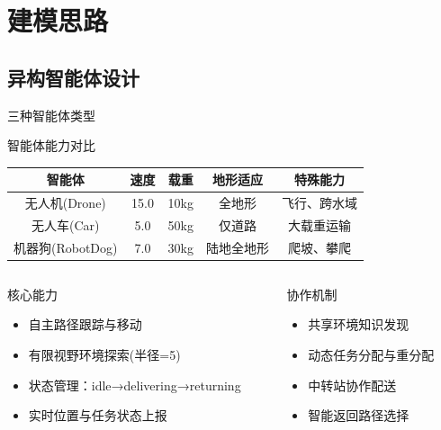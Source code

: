 \documentclass[
10pt,
aspectratio=169,
]{beamer}
\begin{document}
\section{建模思路}

\subsection{异构智能体设计}

\begin{frame}{三种智能体类型}
    \begin{block}{智能体能力对比}
        \begin{center}
        \begin{tabular}{|c|c|c|c|c|}
        \hline
        \textbf{智能体} & \textbf{速度} & \textbf{载重} & \textbf{地形适应} & \textbf{特殊能力} \\
        \hline
        无人机(Drone) & 15.0 & 10kg & 全地形 & 飞行、跨水域 \\
        \hline
        无人车(Car) & 5.0 & 50kg & 仅道路 & 大载重运输 \\
        \hline
        机器狗(RobotDog) & 7.0 & 30kg & 陆地全地形 & 爬坡、攀爬 \\
        \hline
        \end{tabular}
        \end{center}
    \end{block}
    
    \begin{columns}
        \begin{column}{0.5\textwidth}
            \begin{exampleblock}{核心能力}
                \begin{itemize}
                    \item 自主路径跟踪与移动
                    \item 有限视野环境探索(半径=5)
                    \item 状态管理：idle→delivering→returning
                    \item 实时位置与任务状态上报
                \end{itemize}
            \end{exampleblock}
        \end{column}
        \begin{column}{0.5\textwidth}
            \begin{exampleblock}{协作机制}
                \begin{itemize}
                    \item 共享环境知识发现
                    \item 动态任务分配与重分配
                    \item 中转站协作配送
                    \item 智能返回路径选择
                \end{itemize}
            \end{exampleblock}
        \end{column}
    \end{columns}
\end{frame}
\end{document}
